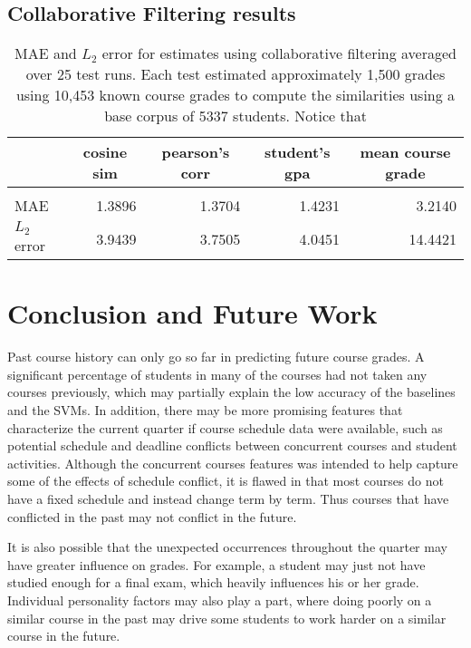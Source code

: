\subsection{Collaborative Filtering results}

\begin{table}[t]\scriptsize
\label{cf-mae-table}
\begin{center}

\begin{tabular}{lrrrr}
    
    &\multicolumn{1}{c}{\bf cosine sim}  &\multicolumn{1}{c}{\bf pearson's corr} &\multicolumn{1}{c}{\bf student's gpa} &\multicolumn{1}{c}{\bf mean course grade}
    \\ \hline \\
    MAE & 1.3896    &1.3704    &1.4231    &3.2140 \\
    $L_2$ error & 3.9439    &3.7505    &4.0451   &14.4421
\end{tabular}
\caption{MAE and $L_2$ error for estimates using collaborative filtering averaged over 25 test runs.  Each test estimated approximately 1,500 grades using 10,453 known course grades to compute the similarities using a base corpus of 5337 students.  Notice that }

\end{center}
\end{table}

\section{Conclusion and Future Work}

Past course history can only go so far in predicting future course grades. A significant percentage of students in many of the courses had not taken any courses previously, which may partially explain the low accuracy of the baselines and the SVMs. In addition, there may be more promising features that characterize the current quarter if course schedule data were available, such as potential schedule and deadline conflicts between concurrent courses and student activities. Although the concurrent courses features was intended to help capture some of the effects of schedule conflict, it is flawed in that most courses do not have a fixed schedule and instead change term by term. Thus courses that have conflicted in the past may not conflict in the future.

It is also possible that the unexpected occurrences throughout the quarter may have greater influence on grades. For example, a student may just not have studied enough for a final exam, which heavily influences his or her grade. Individual personality factors may also play a part, where doing poorly on a similar course in the past may drive some students to work harder on a similar course in the future.

